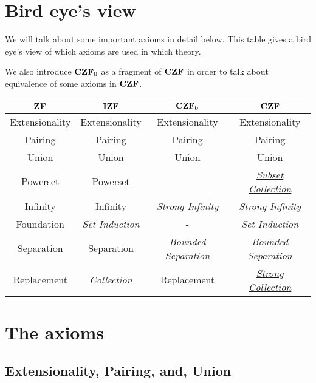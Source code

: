 \documentclass[12pt, a4paper]{article}
\theoremstyle{definition}
\theoremstyle{plain}
\begin{document}
\section{Bird eye's view}

We will talk about some important axioms in detail below.
This table gives a bird eye's view of which axioms are used in which theory.

We also introduce ${\bf CZF}_0$ as a fragment of ${\bf CZF}$ in order to talk about equivalence of some axioms in ${\bf CZF}$.
\begin{center}
\begin{tabular}{ |c|c|c|c| } 
\hline
${\bf ZF}$ & ${\bf IZF}$ & ${\bf CZF}_0$ & ${\bf CZF}$ \\ \hline 
Extensionality & Extensionality & Extensionality & Extensionality\\ 
Pairing & Pairing & Pairing & Pairing \\
Union & Union & Union & Union \\
Powerset & Powerset & - & \underline{\emph{Subset Collection}} \\
Infinity & Infinity & \emph{Strong Infinity} &  \emph{Strong Infinity} \\
Foundation & \emph{Set Induction} & - & \emph{Set Induction} \\
Separation & Separation & \emph{Bounded Separation} & \emph{Bounded Separation} \\
Replacement & \emph{Collection} & Replacement & \underline{\emph{Strong Collection}} \\
\hline
\end{tabular}
\end{center}

\section{The axioms}
\subsection{Extensionality, Pairing, and, Union}
\end{document}
